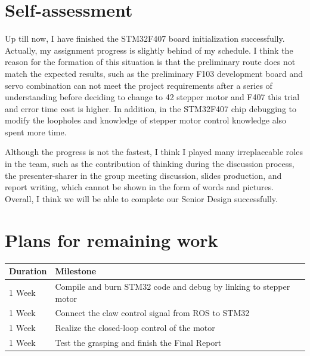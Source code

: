 \documentclass{senior-design-individual}
\begin{document}
\section{Self-assessment}
Up till now, I have finished the STM32F407 board initialization successfully. Actually, my assignment progress is slightly behind of my schedule. I think the reason for the formation of this situation is that the preliminary route does not match the expected results, such as the preliminary F103 development board and servo combination can not meet the project requirements after a series of understanding before deciding to change to 42 stepper motor and F407 this trial and error time cost is higher. In addition, in the STM32F407 chip debugging to modify the loopholes and knowledge of stepper motor control knowledge also spent more time.
 
Although the progress is not the fastest, I think I played many irreplaceable roles in the team, such as the contribution of thinking during the discussion process, the presenter-sharer in the group meeting discussion, slides production, and report writing, which cannot be shown in the form of words and pictures. Overall, I think we will be able to complete our Senior Design successfully.
\section{Plans for remaining work}
\begin{table}[h]
    \centering
    \renewcommand{\arraystretch}{1.5}
    \begin{tabular}{|l|l|}
        \hline
        \textbf{Duration} & \textbf{Milestone} \\
        \hline
        1 Week & Compile and burn STM32 code and debug by linking to stepper motor \\
        \hline
        1 Week & Connect the claw control signal from ROS to STM32 \\
        \hline
        1 Week&Realize the closed-loop control of the motor\\
        \hline
        1 Week & Test the grasping and finish the Final Report \\
        \hline
    \end{tabular}
\end{table}
\clearpage
\renewcommand*{\UrlFont}{\rmfamily}
\printbibliography[title={References},heading=bibintoc]
\clearpage
\end{document}
